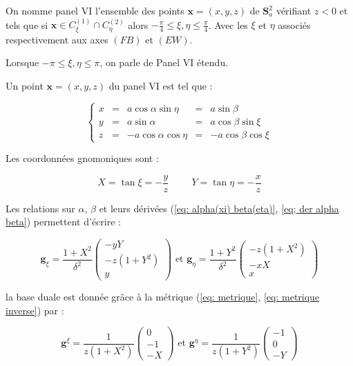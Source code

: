 \begin{definition}
On nomme panel VI l'ensemble des points $\mathbf{x}=(x,y,z)$ de $\mathbf{S}_a^2$ vérifiant $z<0$ et tels que si $\mathbf{x} \in C_{\xi}^{(1)} \cap C_{\eta}^{(2)}$ alors $-\frac{\pi}{4}\leq \xi,\eta \leq \frac{\pi}{4}$. Avec les $\xi$ et $\eta$ associés respectivement aux axes $(FB)$ et $(EW)$.

Lorsque $-\pi \leq \xi,\eta \leq \pi$, on parle de Panel VI étendu.
\end{definition}

Un point $\mathbf{x}=(x,y,z)$ du panel VI est tel que :

\begin{equation}
\left\lbrace
\begin{array}{rcccc}
x & = & a \cos \alpha \sin \eta & = & a \sin \beta \\
y & = & a \sin \alpha & = & a \cos \beta \sin \xi \\
z & = & - a \cos \alpha \cos \eta & = & - a \cos \beta \cos \xi
\end{array}
\right.
\end{equation}

Les coordonnées gnomoniques sont :

\begin{equation}
X = \tan \xi = -\dfrac{y}{z} \hspace{1cm} Y = \tan \eta = -\dfrac{x}{z}
\end{equation}

Les relations sur $\alpha$, $\beta$ et leurs dérivées (\ref{eq: alpha(xi) beta(eta)}, \ref{eq; der alpha beta}) permettent d'écrire :

\begin{equation}
\mathbf{g}_{\xi} = \dfrac{1+X^2}{\delta^2} \begin{pmatrix}
-yY \\ -z(1+Y^2) \\ y
\end{pmatrix} \text{ et } \mathbf{g}_{\eta} = \dfrac{1+Y^2}{\delta^2} \begin{pmatrix}
-z(1+X^2) \\ -xX \\ x
\end{pmatrix}
\label{eq: base locale VI}
\end{equation}

la base duale est donnée grâce à la métrique (\ref{eq: metrique}, \ref{eq: metrique inverse}) par :

\begin{equation}
\mathbf{g}^{\xi} = \dfrac{1}{z(1+X^2)}\begin{pmatrix}
0 \\ -1 \\ -X
\end{pmatrix} \text{ et } \mathbf{g}^{\eta} = \dfrac{1}{z(1+Y^2)}\begin{pmatrix}
-1 \\ 0 \\ -Y
\end{pmatrix}
\label{eq: base duale VI}
\end{equation}


